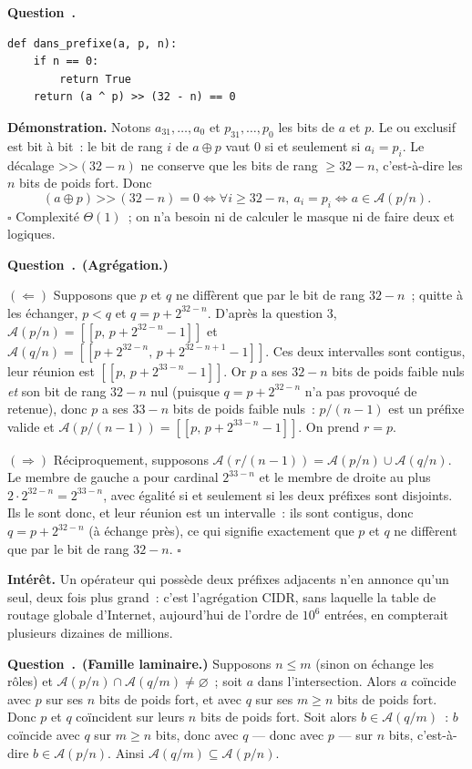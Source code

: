 \documentclass[11pt,a4paper]{article}
\renewcommand{\Q}{\medskip\par\stepcounter{qcnt}\noindent\textbf{\color{cnc}Question~\theqcnt.}~}
\begin{document}
\Q
\begin{lstlisting}
def dans_prefixe(a, p, n):
    if n == 0:
        return True
    return (a ^ p) >> (32 - n) == 0
\end{lstlisting}
\textbf{Démonstration.} Notons $a_{31},\dots,a_0$ et $p_{31},\dots,p_0$ les bits de $a$ et
$p$. Le ou exclusif est bit à bit~: le bit de rang $i$ de $a\oplus p$ vaut $0$ si et
seulement si $a_i=p_i$. Le décalage $\texttt{>>}(32-n)$ ne conserve que les bits de rang
$\ge 32-n$, c'est-à-dire les $n$ bits de poids fort. Donc
\[ (a\oplus p)\,\texttt{>>}\,(32-n)=0 \iff \forall i\ge 32-n,\ a_i=p_i \iff
a\in\mathcal{A}(p/n). \]
\hfill$\square$ Complexité $\Theta(1)$~; on n'a besoin ni de calculer le masque ni de faire
deux et logiques.

\Q \textbf{(Agrégation.)}

$(\Leftarrow)$ Supposons que $p$ et $q$ ne diffèrent que par le bit de rang $32-n$~; quitte à
les échanger, $p<q$ et $q=p+2^{32-n}$. D'après la question 3,
$\mathcal{A}(p/n)=[\![p,\,p+2^{32-n}-1]\!]$ et $\mathcal{A}(q/n)=[\![p+2^{32-n},\,
p+2^{32-n+1}-1]\!]$. Ces deux intervalles sont contigus, leur réunion est
$[\![p,\,p+2^{33-n}-1]\!]$. Or $p$ a ses $32-n$ bits de poids faible nuls \emph{et} son bit
de rang $32-n$ nul (puisque $q=p+2^{32-n}$ n'a pas provoqué de retenue), donc $p$ a ses
$33-n$ bits de poids faible nuls~: $p/(n-1)$ est un préfixe valide et
$\mathcal{A}(p/(n-1))=[\![p,\,p+2^{33-n}-1]\!]$. On prend $r=p$.

$(\Rightarrow)$ Réciproquement, supposons $\mathcal{A}(r/(n-1))=\mathcal{A}(p/n)\cup
\mathcal{A}(q/n)$. Le membre de gauche a pour cardinal $2^{33-n}$ et le membre de droite au
plus $2\cdot 2^{32-n}=2^{33-n}$, avec égalité si et seulement si les deux préfixes sont
disjoints. Ils le sont donc, et leur réunion est un intervalle~: ils sont contigus, donc
$q=p+2^{32-n}$ (à échange près), ce qui signifie exactement que $p$ et $q$ ne diffèrent que
par le bit de rang $32-n$. \hfill$\square$

\textbf{Intérêt.} Un opérateur qui possède deux préfixes adjacents n'en annonce qu'un seul,
deux fois plus grand~: c'est l'agrégation CIDR, sans laquelle la table de routage globale
d'Internet, aujourd'hui de l'ordre de $10^{6}$ entrées, en compterait plusieurs dizaines de
millions.

\Q \textbf{(Famille laminaire.)} Supposons $n\le m$ (sinon on échange les rôles) et
$\mathcal{A}(p/n)\cap\mathcal{A}(q/m)\ne\varnothing$~; soit $a$ dans l'intersection. Alors
$a$ coïncide avec $p$ sur ses $n$ bits de poids fort, et avec $q$ sur ses $m\ge n$ bits de
poids fort. Donc $p$ et $q$ coïncident sur leurs $n$ bits de poids fort. Soit alors
$b\in\mathcal{A}(q/m)$~: $b$ coïncide avec $q$ sur $m\ge n$ bits, donc avec $q$ — donc avec
$p$ — sur $n$ bits, c'est-à-dire $b\in\mathcal{A}(p/n)$. Ainsi
$\mathcal{A}(q/m)\subseteq\mathcal{A}(p/n)$.
\end{document}
